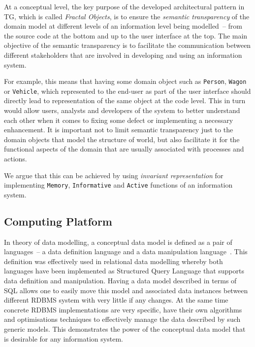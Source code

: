 \documentclass[a4paper,12pt,oneside,openright,final]{memoir} %
\begin{document}
	
	 

	At a conceptual level, the key purpose of the developed architectural pattern in TG, which is called \emph{Fractal Objects}, is to ensure the \emph{semantic transparency} of the domain model at different levels of an information level being modelled~-- from the source code at the bottom and up to the user interface at the top.
  	The main objective of the semantic transparency is to facilitate the communication between different stakeholders that are involved in developing and using an information system.

  	For example, this means that having some domain object such as \texttt{Person}, \texttt{Wagon} or \texttt{Vehicle}, which represented to the end-user as part of the user interface should directly lead to representation of the same object at the code level.
  	This in turn would allow users, analysts and developers of the system to better understand each other when it comes to fixing some defect or implementing a necessary enhancement.
  	It is important not to limit semantic transparency just to the domain objects that model the structure of world, but also facilitate it for the functional aspects of the domain that are usually associated with processes and actions.
  
	We argue that this can be achieved by using \emph{invariant representation} for implementing \texttt{Memory}, \texttt{Informative} and \texttt{Active} functions of an information system.
  
\subsection*{Computing Platform}

	In theory of data modelling, a conceptual data model is defined as a pair of languages~-- a data definition language and a data manipulation language~\cite{kal1983}.
  	This definition was effectively used in relational data modelling whereby both languages have been implemented as Structured Query Language that supports data definition and manipulation.
  	Having a data model described in terms of SQL allows one to easily move this model and associated data instances between different RDBMS system with very little if any changes.
  	At the same time concrete RDBMS implementations are very specific, have their own algorithms and optimisations techniques to effectively manage the data described by such generic models.
  	This demonstrates the power of the conceptual data model that is desirable for any information system.
  
\end{document}
